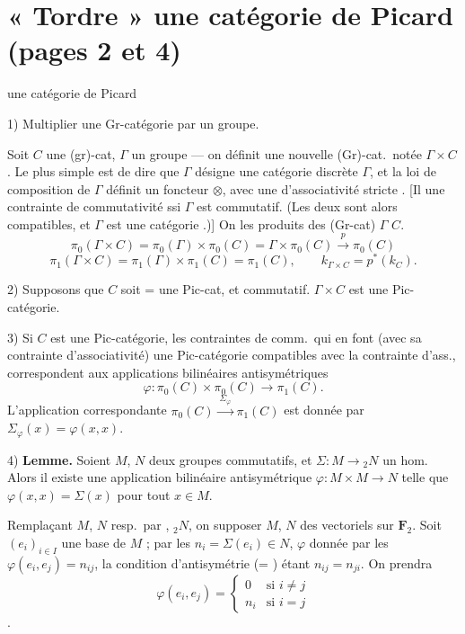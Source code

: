 \documentclass[11pt,a4paper]{article}
\begin{document}
\section*{« Tordre » une catégorie de Picard (pages 2 et 4)}

 une catégorie de Picard

1) Multiplier une Gr-catégorie par un groupe.

Soit $C$ une (gr)-cat, $\Gamma$ un groupe — on définit une nouvelle
(Gr)-cat.\ notée $\Gamma \times C$. Le plus simple est de dire que $\Gamma$
désigne une catégorie discrète  $\Gamma$,
et la loi de composition de $\Gamma$ définit un foncteur $\otimes$, avec une
  d'associativité stricte
. [Il  une contrainte de commutativité
ssi $\Gamma$ est commutatif. (Les deux  sont alors
compatibles, et $\Gamma$ est une catégorie .)] On
 les produits des (Gr-cat) $\Gamma$
 $C$.
\[
\pi_0(\Gamma \times C) = \pi_0(\Gamma) \times \pi_0(C)
= \Gamma \times \pi_0(C) \xrightarrow{\ p\ } \pi_0(C)
\]
\[
\pi_1(\Gamma \times C) = \pi_1(\Gamma) \times \pi_1(C) = \pi_1(C),
\qquad
k_{\Gamma \times C} = p^{*}(k_C).
\]

2) Supposons que $C$ soit = une Pic-cat, et \uncertain{$\Gamma$}
commutatif.  $\Gamma \times C$ est une Pic-catégorie.

3) Si $C$ est une Pic-catégorie, les  contraintes de
comm.\ qui en font (avec sa contrainte d'associativité) une Pic-catégorie
\ill{} compatibles avec la contrainte d'ass., correspondent aux
applications bilinéaires antisymétriques
\[
\varphi : \pi_0(C) \times \pi_0(C) \longrightarrow \pi_1(C).
\]
L'application correspondante $\pi_0(C) \xrightarrow{\ \Sigma_\varphi\ }
\pi_1(C)$ est donnée par $\Sigma_\varphi(x) = \varphi(x,x)$.

4) \textbf{Lemme.} Soient $M$, $N$ deux groupes commutatifs, et
$\Sigma : M \to {}_2N$ un hom. Alors il existe une application bilinéaire
antisymétrique $\varphi : M \times M \to N$ telle que
$\varphi(x,x) = \Sigma(x)$ pour tout $x \in M$.

Remplaçant $M$, $N$ resp.\ par , ${}_2N$, on
 supposer $M$, $N$ des vectoriels sur $\mathbf{F}_2$.
Soit $(e_i)_{i \in I}$ une base de $M$ ;  par les $n_i = \Sigma(e_i) \in N$, 
$\varphi$  donnée par les $\varphi(e_i, e_j) = n_{ij}$, la
condition d'antisymétrie (= ) étant $n_{ij} = n_{ji}$.
On prendra
\[
\varphi(e_i, e_j) =
\begin{cases}
0 & \text{si } i \neq j \\
n_i & \text{si } i = j
\end{cases}
\]
.
\end{document}
